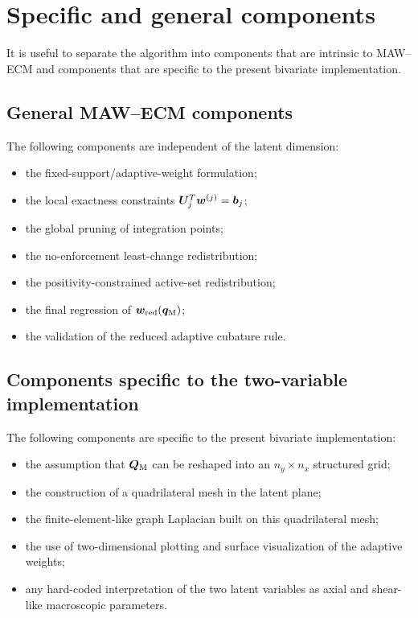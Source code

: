 \documentclass[11pt,a4paper]{article}
\begin{document}
\section{Specific and general components}

It is useful to separate the algorithm into components that are intrinsic to
MAW--ECM and components that are specific to the present bivariate
implementation.

\subsection{General MAW--ECM components}

The following components are independent of the latent dimension:
\begin{itemize}[leftmargin=1.2cm]
    \item the fixed-support/adaptive-weight formulation;
    \item the local exactness constraints $\bm U_j^T\bm w^{(j)}=\bm b_j$;
    \item the global pruning of integration points;
    \item the no-enforcement least-change redistribution;
    \item the positivity-constrained active-set redistribution;
    \item the final regression of $\bm w_{\mathrm{red}}(\bm q_{\mathrm{M}})$;
    \item the validation of the reduced adaptive cubature rule.
\end{itemize}

\subsection{Components specific to the two-variable implementation}

The following components are specific to the present bivariate implementation:
\begin{itemize}[leftmargin=1.2cm]
    \item the assumption that $\bm Q_{\mathrm{M}}$ can be reshaped into an $n_y\times n_x$
    structured grid;
    \item the construction of a quadrilateral mesh in the latent plane;
    \item the finite-element-like graph Laplacian built on this quadrilateral
    mesh;
    \item the use of two-dimensional plotting and surface visualization of the
    adaptive weights;
    \item any hard-coded interpretation of the two latent variables as axial and
    shear-like macroscopic parameters.
\end{itemize}
\end{document}
